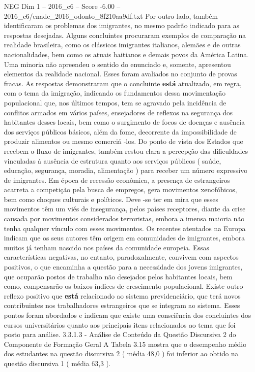 \begin{textsample}{NEG Dim 1 – 2016\_c6 – Score -6.00 – 2016\_c6/enade\_2016\_odonto\_8f210aa9df.txt}
Por outro lado, também identificaram os problemas dos imigrantes, no mesmo padrão indicado para as respostas desejadas.
Alguns concluintes procuraram exemplos de comparação na realidade brasileira, como os clássicos imigrantes italianos, alemães e de outras nacionalidades, bem como os atuais haitianos e demais povos da América Latina.
Uma minoria não apreendeu o sentido do enunciado e, somente, apresentou elementos da realidade nacional.
Esses foram avaliados no conjunto de provas fracas.
As respostas demonstraram que o concluinte \textbf{está} atualizado, em regra, com o tema da imigração, indicando os fundamentos dessa movimentação populacional que, nos últimos tempos, tem se agravado pela incidência de conflitos armados em vários países, ensejadores de reflexos na segurança dos habitantes desses locais, bem como o surgimento de focos de doenças e ausência dos serviços públicos básicos, além da fome, decorrente da impossibilidade de produzir alimentos ou mesmo comerciá -los.
Do ponto de vista dos Estados que recebem o fluxo de imigrantes, também restou clara a percepção das dificuldades vinculadas à ausência de estrutura quanto aos serviços públicos ( saúde, educação, segurança, moradia, alimentação ) para receber um número expressivo de imigrantes.
Em época de recessão econômica, a presença de estrangeiros acarreta a competição pela busca de empregos, gera movimentos xenofóbicos, bem como choques culturais e políticos.
Deve -se ter em mira que esses movimentos têm um viés de insegurança, pelos países receptores, diante da crise causada por movimentos considerados terroristas, embora a imensa maioria não tenha qualquer vínculo com esses movimentos.
Os recentes atentados na Europa indicam que os seus autores têm origem em comunidades de imigrantes, embora muitos já tenham nascido nos países da comunidade europeia.
Essas características negativas, no entanto, paradoxalmente, convivem com aspectos positivos, o que encaminha a questão para a necessidade dos jovens imigrantes, que ocuparão postos de trabalho não desejados pelos habitantes locais, bem como, compensarão os baixos índices de crescimento populacional.
Existe outro reflexo positivo que \textbf{está} relacionado ao sistema previdenciário, que terá novos contribuintes nos trabalhadores estrangeiros que se integram ao sistema.
Esses pontos foram abordados e indicam que existe uma consciência dos concluintes dos cursos universitários quanto aos principais itens relacionados ao tema que foi posto para análise. 3.3.1.3 - Análise de Conteúdo da Questão Discursiva 2 do Componente de Formação Geral A Tabela 3.15 mostra que o desempenho médio dos estudantes na questão discursiva 2 ( média 48,0 ) foi inferior ao obtido na questão discursiva 1 ( média 63,3 ).

\end{textsample}
